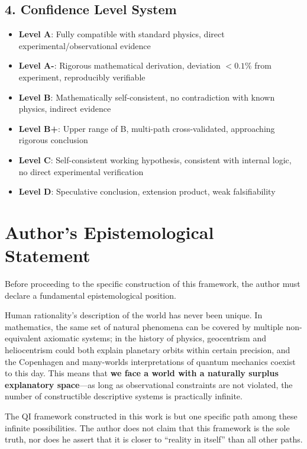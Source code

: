 \documentclass[12pt,a4paper,twocolumn]{article}
\begin{document}
\subsection*{4. Confidence Level System}
\begin{itemize}
\item \textbf{Level A}: Fully compatible with standard physics, direct experimental/observational evidence
\item \textbf{Level A-}: Rigorous mathematical derivation, deviation $<0.1\%$ from experiment, reproducibly verifiable
\item \textbf{Level B}: Mathematically self-consistent, no contradiction with known physics, indirect evidence
\item \textbf{Level B+}: Upper range of B, multi-path cross-validated, approaching rigorous conclusion
\item \textbf{Level C}: Self-consistent working hypothesis, consistent with internal logic, no direct experimental verification
\item \textbf{Level D}: Speculative conclusion, extension product, weak falsifiability
\end{itemize}



\section*{Author's Epistemological Statement}

Before proceeding to the specific construction of this framework, the author must declare a fundamental epistemological position.

Human rationality's description of the world has never been unique. In mathematics, the same set of natural phenomena can be covered by multiple non-equivalent axiomatic systems; in the history of physics, geocentrism and heliocentrism could both explain planetary orbits within certain precision, and the Copenhagen and many-worlds interpretations of quantum mechanics coexist to this day. This means that \textbf{we face a world with a naturally surplus explanatory space}---as long as observational constraints are not violated, the number of constructible descriptive systems is practically infinite.

The QI framework constructed in this work is but one specific path among these infinite possibilities. The author does not claim that this framework is the sole truth, nor does he assert that it is closer to ``reality in itself'' than all other paths.
\end{document}
